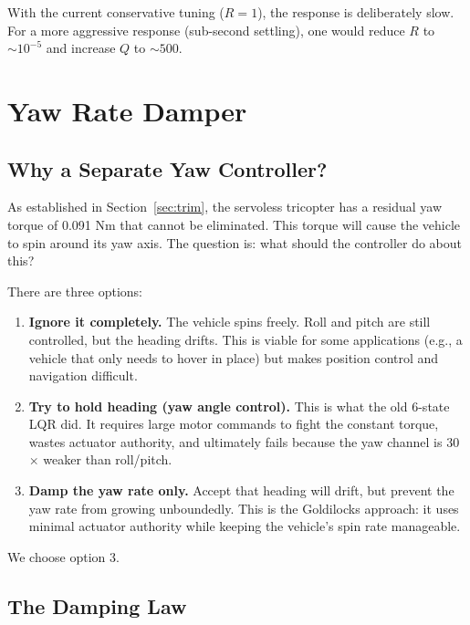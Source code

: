 \documentclass[12pt, a4paper]{article}
\begin{document}
With the current conservative tuning ($R = 1$), the response is deliberately slow.  For a more aggressive response (sub-second settling), one would reduce $R$ to $\sim 10^{-5}$ and increase $Q$ to $\sim 500$.

\section{Yaw Rate Damper}
\label{sec:yaw_damper}

\subsection{Why a Separate Yaw Controller?}

As established in Section~\ref{sec:trim}, the servoless tricopter has a residual yaw torque of 0.091 Nm that cannot be eliminated.  This torque will cause the vehicle to spin around its yaw axis.  The question is: what should the controller do about this?

There are three options:
\begin{enumerate}
    \item \textbf{Ignore it completely.}  The vehicle spins freely.  Roll and pitch are still controlled, but the heading drifts.  This is viable for some applications (e.g., a vehicle that only needs to hover in place) but makes position control and navigation difficult.

    \item \textbf{Try to hold heading (yaw angle control).}  This is what the old 6-state LQR did.  It requires large motor commands to fight the constant torque, wastes actuator authority, and ultimately fails because the yaw channel is 30$\times$ weaker than roll/pitch.

    \item \textbf{Damp the yaw rate only.}  Accept that heading will drift, but prevent the yaw rate from growing unboundedly.  This is the Goldilocks approach: it uses minimal actuator authority while keeping the vehicle's spin rate manageable.
\end{enumerate}

We choose option 3.

\subsection{The Damping Law}
\end{document}
